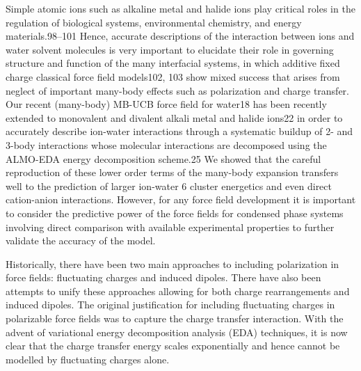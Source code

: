 \documentclass[journal=jacsat,manuscript=article]{achemso}
\begin{document}
Simple atomic ions such as alkaline metal and halide ions play critical roles in the regulation of biological
systems, environmental chemistry, and energy materials.98–101 Hence, accurate descriptions of the
interaction between ions and water solvent molecules is very important to elucidate their role in governing
structure and function of the many interfacial systems, in which additive fixed charge classical force field
models102, 103 show mixed success that arises from neglect of important many-body effects such as polarization
and charge transfer. Our recent (many-body) MB-UCB force field for water18 has been recently
extended to monovalent and divalent alkali metal and halide ions22 in order to accurately describe ion-water
interactions through a systematic buildup of 2- and 3-body interactions whose molecular interactions are decomposed
using the ALMO-EDA energy decomposition scheme.25 We showed that the careful reproduction
of these lower order terms of the many-body expansion transfers well to the prediction of larger ion-water
6
cluster energetics and even direct cation-anion interactions. However, for any force field development it is
important to consider the predictive power of the force fields for condensed phase systems involving direct
comparison with available experimental properties to further validate the accuracy of the model.



Historically, there have been two main approaches to including
polarization in force fields: fluctuating charges\cite{rick1994dynamical}
and induced dipoles\cite{applequist1985multipole}. There have also been
attempts to unify these approaches allowing for both charge rearrangements
and induced dipoles.\cite{stern2001combined} The original justification for
including fluctuating charges in polarizable force fields was to
capture the charge transfer interaction.\cite{rick1994dynamical} With the advent
of variational energy decomposition analysis (EDA) techniques\cite{horn2016probing,mao2021intermolecular},
it is now clear that the charge transfer energy scales exponentially and hence
cannot be modelled by fluctuating charges alone.
\end{document}
